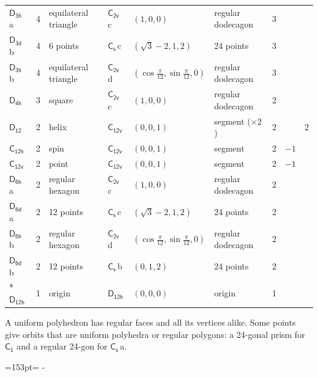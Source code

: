 \documentclass[10pt,a4paper]{article}
\newcommand{\needspace}[1]{\par\penalty-100\begingroup\dimen0=#1\relax\dimen2=\pagegoal
  \advance\dimen2-\pagetotal\ifdim\dimen0>\dimen2\relax\ifdim\dimen2>0pt\vfil\break\fi\fi
  \endgroup}
\numberwithin{equation}{section}
\newcommand{\grp}[1]{\mathsf{#1}}
\newcommand{\clsletter}[1]{\,{\scriptsize\color{black!55}#1}}
\newlength{\fillwidth}\newlength{\cellwidth}\newlength{\colwidth}
\begin{document}
{{\begin{longtable}{@{}lrllllr>{\RaggedRight\arraybackslash}p{\fillwidth}r@{}}
\href{D3h.pdf}{$\grp{D_{3h}}$}\clsletter{a} & 4 & equilateral triangle & \href{C2v.pdf}{$\grp{C_{2v}}$}\clsletter{c} & $(1, 0, 0)$ & regular dodecagon & 3 &  & \\
\href{D3d.pdf}{$\grp{D_{3d}}$}\clsletter{b} & 4 & 6 points & \href{C1v.pdf}{$\grp{C_{s}}$}\clsletter{c} & $(\sqrt{3} - 2, 1, 2)$ & 24 points & 3 &  & \\
\href{D3h.pdf}{$\grp{D_{3h}}$}\clsletter{b} & 4 & equilateral triangle & \href{C2v.pdf}{$\grp{C_{2v}}$}\clsletter{d} & $(\cos\tfrac{\pi}{12}, \sin\tfrac{\pi}{12}, 0)$ & regular dodecagon & 3 &  & \\
\href{D4h.pdf}{$\grp{D_{4h}}$} & 3 & square & \href{C2v.pdf}{$\grp{C_{2v}}$}\clsletter{c} & $(1, 0, 0)$ & regular dodecagon & 2 &  & \\
\href{D12.pdf}{$\grp{D_{12}}$} & 2 & helix & \href{C12v.pdf}{$\grp{C_{12v}}$} & $(0, 0, 1)$ & segment (${\times}2$) & 2 &  & 2\\
\href{C12h.pdf}{$\grp{C_{12h}}$} & 2 & spin & \href{C12v.pdf}{$\grp{C_{12v}}$} & $(0, 0, 1)$ & segment & 2 & ${-1}$ & \\
\href{C12v.pdf}{$\grp{C_{12v}}$} & 2 & point & \href{C12v.pdf}{$\grp{C_{12v}}$} & $(0, 0, 1)$ & segment & 2 & ${-1}$ & \\
\href{D6h.pdf}{$\grp{D_{6h}}$}\clsletter{a} & 2 & regular hexagon & \href{C2v.pdf}{$\grp{C_{2v}}$}\clsletter{c} & $(1, 0, 0)$ & regular dodecagon & 2 &  & \\
\href{D6d.pdf}{$\grp{D_{6d}}$}\clsletter{a} & 2 & 12 points & \href{C1v.pdf}{$\grp{C_{s}}$}\clsletter{c} & $(\sqrt{3} - 2, 1, 2)$ & 24 points & 2 &  & \\
\href{D6h.pdf}{$\grp{D_{6h}}$}\clsletter{b} & 2 & regular hexagon & \href{C2v.pdf}{$\grp{C_{2v}}$}\clsletter{d} & $(\cos\tfrac{\pi}{12}, \sin\tfrac{\pi}{12}, 0)$ & regular dodecagon & 2 &  & \\
\href{D6d.pdf}{$\grp{D_{6d}}$}\clsletter{b} & 2 & 12 points & \href{C1v.pdf}{$\grp{C_{s}}$}\clsletter{b} & $(0, 1, 2)$ & 24 points & 2 &  & \\*
\href{D12h.pdf}{$\grp{D_{12h}}$} & 1 & origin & \href{D12h.pdf}{$\grp{D_{12h}}$} & $(0, 0, 0)$ & origin & 1 &  & \\
\bottomrule\end{longtable}}}
A uniform polyhedron has regular faces and all its vertices alike. Some points give orbits that are uniform polyhedra or regular polygons: a 24-gonal prism for \href{C1.pdf}{$\grp{C_{1}}$} and a regular 24-gon for \href{C1v.pdf}{$\grp{C_{s}}$}\clsletter{a}.
\needspace{153pt}
\end{document}
